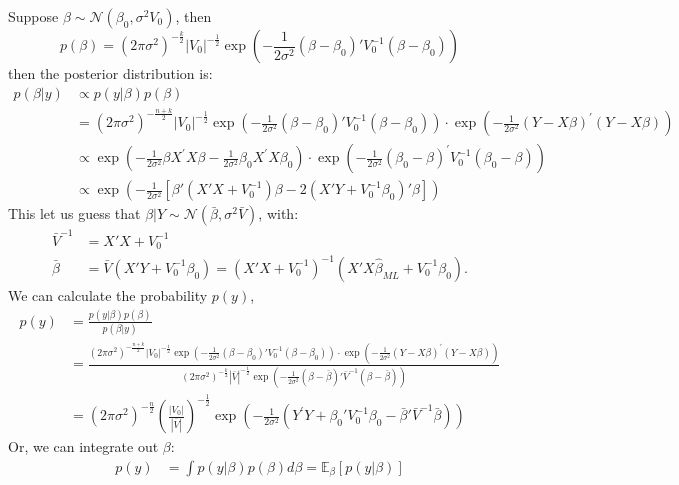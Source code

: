 \begin{eg}
    Suppose $\beta \sim \mathcal{N}(\beta_0, \sigma^2 V_0)$, then
    \begin{equation}
        p(\beta ) = (2\pi \sigma^2 )^{ -\frac{k}{2}} | V_0|^{ -\frac{1}{2}} \exp \left( -\frac{1}{2\sigma^2} (\beta - \beta_0)' V_0^{-1} (\beta - \beta_0) \right)
    \end{equation}
    then the posterior distribution is:
    \begin{align}
        p(\beta | y) & \propto p(y | \beta) p(\beta) \\
        &= (2\pi \sigma^2 )^{ -\frac{n + k}{2}} | V_0|^{ -\frac{1}{2}} \exp \left( -\frac{1}{2\sigma^2} (\beta - \beta_0)' V_0^{-1} (\beta - \beta_0) \right) \cdot \exp \left( -\frac{1}{2\sigma^2} \left(Y - X \beta \right)^{\prime} \left(Y - X \beta \right) \right) \\
        & \propto \exp \left( -\frac{1}{2\sigma^2} \beta X^{\prime} X \beta - \frac{1}{2\sigma^2} \beta_0 X^{\prime} X \beta_0 \right) \cdot \exp \left( -\frac{1}{2\sigma^2} \left(\beta_0 - \beta \right)^{\prime} V_0^{-1} \left(\beta_0 - \beta \right) \right) \\
        & \propto \exp \left( -\frac{1}{2\sigma^2} \left[ \beta' (X'X + V_0^{-1}) \beta - 2 (X' Y + V_0^{-1} \beta_0)' \beta \right] \right)
    \end{align}
    This let us guess that $\beta | Y \sim \mathcal{N}(\bar{\beta }, \sigma^2 \bar{V})$,
    with:
    \begin{align}
        \bar{V}^{-1} &= X'X + V_0^{-1} \\
        \bar{\beta } &= \bar{V} \left( X'Y + V_0^{-1} \beta_0 \right) = \left(X'X + V_0^{-1}\right)^{-1} \left(X' X \hat{\beta }_{ML}  + V_0^{-1} \beta_0 \right).
    \end{align}
    We can calculate the probability $p(y)$,
    \begin{align*}
        p(y) &= \frac{p(y | \beta ) p(\beta )}{p(\beta | y )} \\
        &= \frac{(2\pi \sigma^2 )^{ -\frac{n + k}{2}} | V_0|^{ -\frac{1}{2}} \exp \left( -\frac{1}{2\sigma^2} (\beta - \beta_0)' V_0^{-1} (\beta - \beta_0) \right) \cdot \exp \left( -\frac{1}{2\sigma^2} \left(Y - X \beta \right)^{\prime} \left(Y - X \beta \right) \right)}{(2\pi \sigma^2 )^{ -\frac{k}{2}} | \bar{V}|^{ -\frac{1}{2}} \exp \left( -\frac{1}{2\sigma^2} (\beta - \bar{\beta })' \bar{V}^{-1} (\beta - \bar{\beta }) \right)} \\
        &= (2\pi \sigma^2 )^{ -\frac{n}{2}} \left(\frac{| V_0|}{|\bar{V}| } \right)^{ -\frac{1}{2}} \exp \left( -\frac{1}{2\sigma^2} \left(Y^{\prime} Y + \beta_0' V_0^{-1} \beta_0 - \bar{\beta }' \bar{V}^{-1} \bar{\beta } \right) \right)
    \end{align*}
    Or, we can integrate out $\beta $:
    \begin{align*}
        p(y) &= \int p(y | \beta ) p(\beta ) d\beta = \mathbb{E}_\beta [p(y | \beta )]
    \end{align*}
\end{eg}

